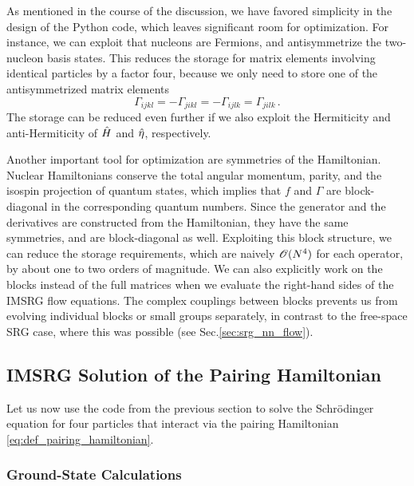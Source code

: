 As mentioned in the course of the discussion, we have favored simplicity 
in the design of the Python code, which leaves significant room for optimization.
For instance, we can exploit that nucleons are Fermions, and 
antisymmetrize the two-nucleon basis states. This reduces the storage for
matrix elements involving identical particles by a factor four, because
we only need to store one of the antisymmetrized matrix elements 
\begin{equation}
  \Gamma_{ijkl} = -\Gamma_{jikl} = - \Gamma_{ijlk} = \Gamma_{jilk}\,.
\end{equation}
The storage can be reduced even further if we also exploit the Hermiticity
and anti-Hermiticity of $\hat{H}$ and $\hat{\eta}$, respectively.

Another important tool for optimization are symmetries of the Hamiltonian.
Nuclear Hamiltonians conserve the total angular momentum, parity, and the 
isospin projection of quantum states, which implies that $f$ and $\Gamma$ 
are block-diagonal in the corresponding quantum numbers. Since the generator 
and the derivatives are constructed from the Hamiltonian, they have the
same symmetries, and are block-diagonal as well. Exploiting this block
structure, we can reduce the storage requirements, which are naively $\mathcal{O}(N^4)$
for each operator, by about one to two orders of magnitude. We can 
also explicitly work on the blocks instead of the full matrices when 
we evaluate the right-hand sides of the IMSRG flow equations.  The complex 
couplings between blocks prevents us from evolving individual blocks or
small groups separately, in contrast to the free-space SRG case, where
this was possible (see Sec.\ref{sec:srg_nn_flow}). 



\subsection{\label{sec:imsrg_pairing}IMSRG Solution of the Pairing Hamiltonian}
Let us now use the code from the previous section to solve the 
Schr\"odinger equation for four particles that interact via the pairing
Hamiltonian \eqref{eq:def_pairing_hamiltonian}.

%
%
\subsubsection{Ground-State Calculations}

